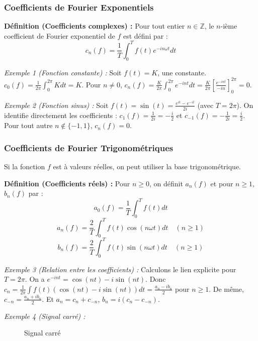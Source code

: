\documentclass[11pt,a4paper]{article}
\begin{document}
\subsubsection*{Coefficients de Fourier Exponentiels}

\textbf{Définition (Coefficients complexes) :}
Pour tout entier $n \in \mathbb{Z}$, le $n$-ième coefficient de Fourier exponentiel de $f$ est défini par :
$$ c_n(f) = \frac{1}{T} \int_0^T f(t) e^{-in\omega t} dt $$

\textit{Exemple 1 (Fonction constante) :}
Soit $f(t) = K$, une constante.
$c_0(f) = \frac{1}{2\pi} \int_0^{2\pi} K dt = K$.
Pour $n \neq 0$, $c_n(f) = \frac{K}{2\pi} \int_0^{2\pi} e^{-int} dt = \frac{K}{2\pi} \left[ \frac{e^{-int}}{-in} \right]_0^{2\pi} = 0$.

\textit{Exemple 2 (Fonction sinus) :}
Soit $f(t) = \sin(t) = \frac{e^{it} - e^{-it}}{2i}$ (avec $T = 2\pi$).
On identifie directement les coefficients :
$c_1(f) = \frac{1}{2i} = -\frac{i}{2}$ et $c_{-1}(f) = -\frac{1}{2i} = \frac{i}{2}$.
Pour tout autre $n \notin \{-1, 1\}$, $c_n(f) = 0$.

\subsubsection*{Coefficients de Fourier Trigonométriques}

Si la fonction $f$ est à valeurs réelles, on peut utiliser la base trigonométrique.

\textbf{Définition (Coefficients réels) :}
Pour $n \ge 0$, on définit $a_n(f)$ et pour $n \ge 1$, $b_n(f)$ par :
$$ a_0(f) = \frac{1}{T} \int_0^T f(t) dt $$
$$ a_n(f) = \frac{2}{T} \int_0^T f(t) \cos(n\omega t) dt \quad (n \ge 1) $$
$$ b_n(f) = \frac{2}{T} \int_0^T f(t) \sin(n\omega t) dt \quad (n \ge 1) $$

\textit{Exemple 3 (Relation entre les coefficients) :}
Calculons le lien explicite pour $T=2\pi$. On a $e^{-int} = \cos(nt) - i\sin(nt)$.
Donc $c_n = \frac{1}{2\pi} \int f(t)(\cos(nt) - i\sin(nt))dt = \frac{a_n - ib_n}{2}$ pour $n \ge 1$.
De même, $c_{-n} = \frac{a_n + ib_n}{2}$.
Et $a_n = c_n + c_{-n}$, $b_n = i(c_n - c_{-n})$.

\textit{Exemple 4 (Signal carré) :}

\begin{figure}[h!]
\centering
{}
\caption{Signal carré}
\end{figure}
\end{document}
